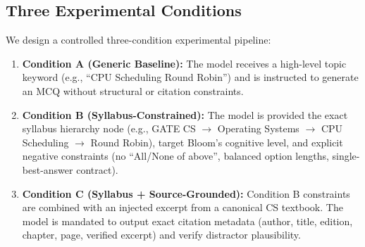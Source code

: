 \documentclass[10pt,twocolumn,letterpaper]{article}
\begin{document}
\subsection{Three Experimental Conditions}
We design a controlled three-condition experimental pipeline:
\begin{enumerate}
    \item \textbf{Condition A (Generic Baseline):} The model receives a high-level topic keyword (e.g., ``CPU Scheduling Round Robin'') and is instructed to generate an MCQ without structural or citation constraints.
    \item \textbf{Condition B (Syllabus-Constrained):} The model is provided the exact syllabus hierarchy node (e.g., GATE CS $\rightarrow$ Operating Systems $\rightarrow$ CPU Scheduling $\rightarrow$ Round Robin), target Bloom's cognitive level, and explicit negative constraints (no ``All/None of above'', balanced option lengths, single-best-answer contract).
    \item \textbf{Condition C (Syllabus + Source-Grounded):} Condition B constraints are combined with an injected excerpt from a canonical CS textbook. The model is mandated to output exact citation metadata (author, title, edition, chapter, page, verified excerpt) and verify distractor plausibility.
\end{enumerate}
\end{document}

